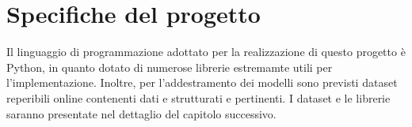 \section{Specifiche del progetto}
Il linguaggio di programmazione adottato per la realizzazione di questo progetto è Python, in quanto dotato di numerose librerie estremamte utili 
per l'implementazione. Inoltre, per l'addestramento dei modelli sono previsti dataset reperibili online contenenti dati e strutturati e pertinenti.
I dataset e le librerie saranno presentate nel dettaglio del capitolo successivo.